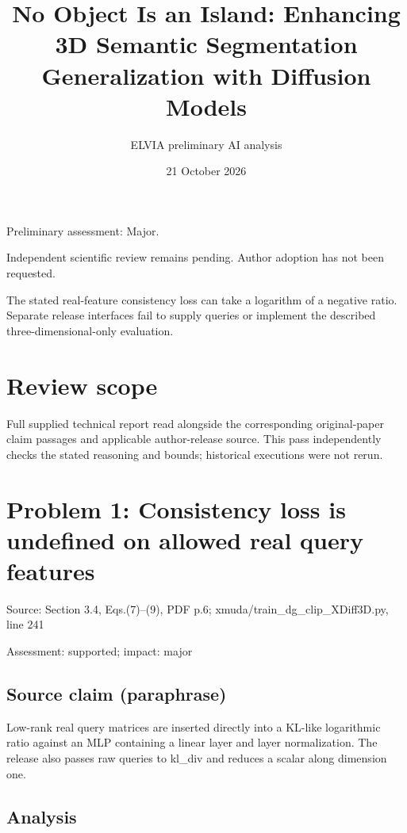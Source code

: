\documentclass[11pt]{article}
\begin{document}
\title{No Object Is an Island: Enhancing 3D Semantic Segmentation Generalization with Diffusion Models}

\author{ELVIA preliminary AI analysis}\date{21 October 2026}\maketitle

Preliminary assessment: Major.\par

Independent scientific review remains pending. Author adoption has not been requested.

The stated real-feature consistency loss can take a logarithm of a negative ratio. Separate release interfaces fail to supply queries or implement the described three-dimensional-only evaluation.

\section*{Review scope}

Full supplied technical report read alongside the corresponding original-paper claim passages and applicable author-release source. This pass independently checks the stated reasoning and bounds; historical executions were not rerun.

\section*{Problem 1: Consistency loss is undefined on allowed real query features}

Source: Section 3.4, Eqs.(7)–(9), PDF p.6; xmuda/train\_dg\_clip\_XDiff3D.py, line 241

Assessment: supported; impact: major

\subsection*{Source claim (paraphrase)}

Low-rank real query matrices are inserted directly into a KL-like logarithmic ratio against an MLP containing a linear layer and layer normalization. The release also passes raw queries to kl\_div and reduces a scalar along dimension one.

\subsection*{Analysis}
\end{document}
